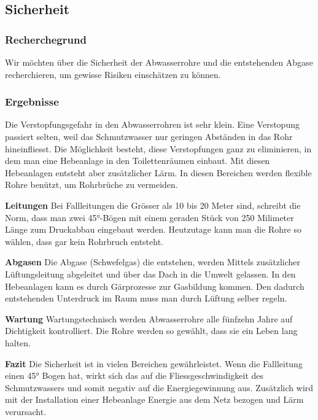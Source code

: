 \subsection{Sicherheit}


\subsubsection{Recherchegrund}
Wir möchten über die Sicherheit der Abwasserrohre und die entstehenden Abgase recherchieren, um gewisse Risiken einschätzen zu können. 

\subsubsection{Ergebnisse}

Die Verstopfungsgefahr in den Abwasserrohren ist sehr klein. Eine Verstopung passiert selten, weil das Schmutzwasser nur geringen Abständen in das Rohr hineinfliesst. Die Möglichkeit besteht, diese Verstopfungen ganz zu eliminieren, in dem man eine Hebeanlage in den Toilettenräumen einbaut. Mit diesen Hebeanlagen entsteht aber zusätzlicher Lärm. In diesen Bereichen werden flexible Rohre benützt, um Rohrbrüche zu vermeiden.

\textbf{Leitungen}
Bei Fallleitungen die Grösser als 10 bis 20 Meter sind, schreibt die Norm, dass man zwei 45°-Bögen mit einem geraden Stück von 250 Milimeter Länge zum Druckabbau eingebaut werden. Heutzutage kann man die Rohre so wählen, dass gar kein Rohrbruch entsteht.

\textbf{Abgasen}
Die Abgase (Schwefelgas) die entstehen, werden Mittels zusätzlicher Lüftungsleitung abgeleitet und über das Dach in die Umwelt gelassen. In den Hebeanlagen kann es durch Gärprozesse zur Gasbildung kommen. Den dadurch entstehenden Unterdruck im Raum muss man durch Lüftung selber regeln. 

\textbf{Wartung}
Wartungstechnisch werden Abwasserrohre alle fünfzehn Jahre auf Dichtigkeit kontrolliert. Die Rohre werden so gewählt, dass sie ein Leben lang halten.

\textbf{Fazit}
Die Sicherheit ist in vielen Bereichen gewährleistet. Wenn die Fallleitung einen 45° Bogen hat, wirkt sich das auf die Fliessgeschwindigkeit des Schmutzwassers und somit negativ auf die Energiegewinnung aus. Zusätzlich wird mit der Installation einer Hebeanlage Energie aus dem Netz bezogen und Lärm verursacht.

\clearpage 





